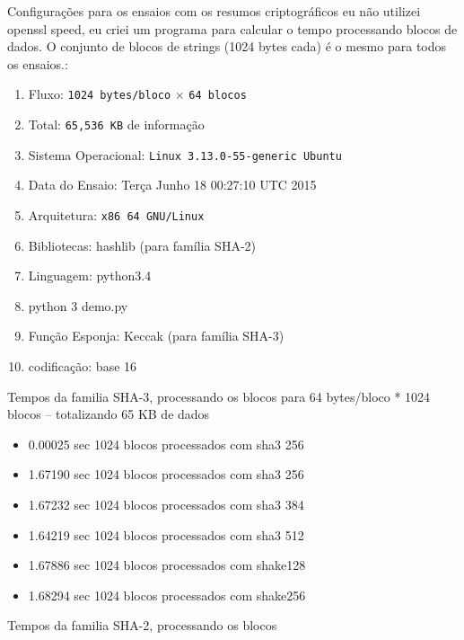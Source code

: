 \documentclass[12pt, a4paper]{article}
\begin{document}
\begin{enumerate}
  Configurações para os ensaios com os resumos criptográficos eu não utilizei
  openssl speed, eu criei um programa para calcular o tempo processando blocos
  de dados. O conjunto de blocos de strings (1024 bytes cada) é o mesmo para
  todos os ensaios.:

  \begin{enumerate}
    \item Fluxo: \verb|1024 bytes/bloco| $\times$ \verb|64 blocos|
    \item Total: \verb|65,536 KB| de informação
    \item Sistema Operacional: \verb|Linux 3.13.0-55-generic Ubuntu|
    \item Data do Ensaio: Terça Junho 18 00:27:10 UTC 2015
    \item Arquitetura: \verb|x86 64 GNU/Linux|
    \item Bibliotecas: hashlib (para família SHA-2)
    \item Linguagem: python3.4
    \item python 3 demo.py
    \item Função Esponja: Keccak (para família SHA-3)
    \item codificação: base 16
  \end{enumerate}

  Tempos da familia SHA-3, processando os blocos para 64 bytes/bloco * 1024
  blocos -- totalizando 65 KB de dados\\

  \begin{itemize}
    \item
    0.00025 sec
    1024 blocos processados com sha3 256

    \item
    1.67190 sec
    1024 blocos processados com sha3 256

    \item
    1.67232 sec
    1024 blocos processados com sha3 384

    \item
    1.64219 sec
    1024 blocos processados com sha3 512

    \item
    1.67886 sec
    1024 blocos processados com shake128

    \item
    1.68294 sec
    1024 blocos processados com shake256\\
  \end{itemize}

    Tempos da familia SHA-2, processando os blocos\\


\end{enumerate}
\end{document}
